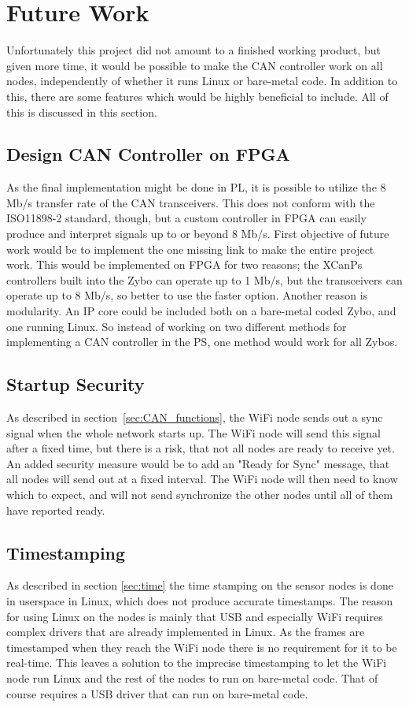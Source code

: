 
\section{Future Work}\label{sec:future_work}
Unfortunately this project did not amount to a finished working product, but given more time, it would be possible to make the CAN controller work on all nodes, independently of whether it runs Linux or bare-metal code.
In addition to this, there are some features which would be  highly beneficial to include.
All of this is discussed in this section.

\subsection*{Design CAN Controller on FPGA}
As the final implementation might be done in PL, it is possible to utilize the 8 Mb/s transfer rate of the CAN transceivers.
This does not conform with the ISO11898-2 standard, though, but a custom controller in FPGA can easily produce and interpret signals up to or beyond 8 Mb/s.
First objective of future work would be to implement the one missing link to make the entire project work.
This would be implemented on FPGA for two reasons;
the XCanPs controllers built into the Zybo can operate up to 1 Mb/s, but the transceivers can operate up to 8 Mb/s, so better to use the faster option.
Another reason is modularity.
An IP core could be included both on a bare-metal coded Zybo, and one running Linux.
So instead of working on two different methods for implementing a CAN controller in the PS, one method would work for all Zybos.

\subsection*{Startup Security}
As described in section~\ref{sec:CAN_functions}, the WiFi node sends out a sync signal when the whole network starts up.
The WiFi node will send this signal after a fixed time, but there is a risk, that not all nodes are ready to receive yet. 
An added security measure would be to add an "Ready for Sync" message, that all nodes will send out at a fixed interval.
The WiFi node will then need to know which to expect, and will not send synchronize the other nodes until all of them have reported ready.

\subsection*{Timestamping}
As described in section \ref{sec:time} the time stamping on the sensor nodes is done in userspace in Linux, which does not produce accurate timestamps.
The reason for using Linux on the nodes is mainly that USB and especially WiFi requires complex drivers that are already implemented in Linux.
As the frames are timestamped when they reach the WiFi node there is no requirement for it to be real-time.
This leaves a solution to the imprecise timestamping to let the WiFi node run Linux and the rest of the nodes to run on bare-metal code.
That of course requires a USB driver that can run on bare-metal code.

